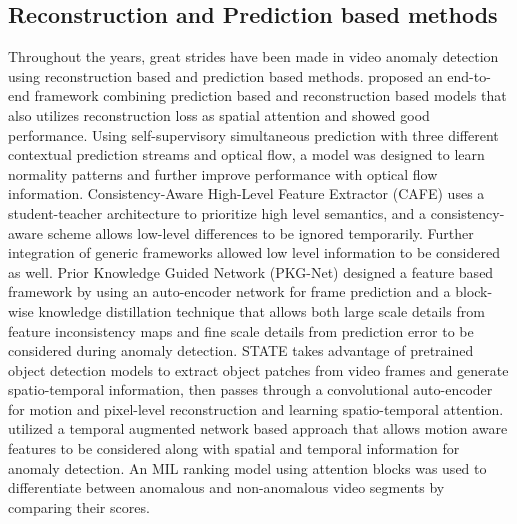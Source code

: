 \documentclass[runningheads]{llncs}
\begin{document}
\subsection{Reconstruction and Prediction based methods}
Throughout the years, great strides have been made in video anomaly detection using reconstruction based and prediction based methods. \cite{end2end} proposed an end-to-end framework combining prediction based and reconstruction based models that also utilizes reconstruction loss as spatial attention and showed good performance.\cite{multivit} Using self-supervisory simultaneous prediction with three different contextual prediction streams and optical flow, a model was designed to learn normality patterns and further improve performance with optical flow information. Consistency-Aware High-Level Feature Extractor (CAFE)\cite{cafe} uses a student-teacher architecture to prioritize high level semantics, and a consistency-aware scheme allows low-level differences to be ignored temporarily. Further integration of generic frameworks allowed low level information to be considered as well. Prior Knowledge Guided Network (PKG-Net)\cite{pkgnet} designed a feature based framework by using an auto-encoder network for frame prediction and a block-wise knowledge distillation technique that allows both large scale details from feature inconsistency maps and fine scale details from prediction error to be considered during anomaly detection. STATE\cite{state} takes advantage of pretrained object detection models to extract object patches from video frames and generate spatio-temporal information, then passes through a convolutional auto-encoder for motion and pixel-level reconstruction and learning spatio-temporal attention. \cite{ma} utilized a temporal augmented network based approach that allows motion aware features to be considered along with spatial and temporal information for anomaly detection. An MIL ranking model using attention blocks was used to differentiate between anomalous and non-anomalous video segments by comparing their scores.
\end{document}
